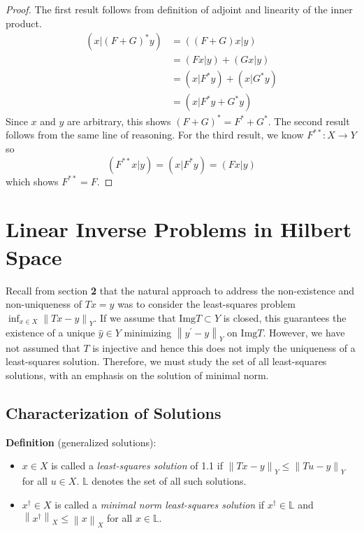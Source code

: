 \documentclass[12pt]{article}
\newcommand*{\norm}[1]{\left\lVert#1\right\rVert}
\newcommand{\Img}{\mathrm{Img}}
\begin{document}
\begin{proof} 
The first result follows from definition of adjoint and linearity of the inner product. 
\begin{align*} 
(x|(F + G)^*y) &= ((F + G)x|y) \\
                       &= (Fx|y) + (Gx|y) \\
                       &= (x|F^*y) + (x|G^*y) \\
                       &= (x|F^*y + G^*y)
\end{align*} 
Since $x$ and $y$ are arbitrary, this shows $(F + G)^* = F^* + G^*$. The second result follows from the 
same line of reasoning. For the third result, we know $F^{**}: X \to Y$ so 
\begin{equation*} 
(F^{**}x|y) = (x|F^*y) = (Fx|y)
\end{equation*} 
which shows $F^{**} = F$.
\end{proof} 




\section{Linear Inverse Problems in Hilbert Space}

 Recall from section \textbf{2} that the natural approach to address the non-existence and non-uniqueness of $Tx = y$ was to consider the least-squares problem $\inf_{x \in X} \norm{Tx - y}_Y$. If we assume that $\Img T \subset Y$ is closed, this guarantees the existence of a unique $\hat{y} \in Y$ minimizing $\norm{y^\prime - y}_Y$ on $\Img T$. However, we have not assumed that $T$ is injective and hence this does not imply the uniqueness of a least-squares solution. Therefore, we must study the set of all least-squares solutions, with an emphasis on the solution of minimal norm. 

\subsection{Characterization of Solutions}

 \textbf{Definition} (generalized solutions): 
 \begin{itemize}
 \item $x \in X$ is called a \textit{least-squares solution} of 1.1 if $\norm{Tx - y}_Y \leq \norm{Tu - y}_Y$ for all $u \in X$. $\mathbb{L}$ denotes the set of all such solutions. 
 \item $x^\dagger \in X$ is called a \textit{minimal norm least-squares solution} if $x^\dagger \in \mathbb{L}$ and $\norm{x^\dagger}_X \leq \norm{x}_X$ for all $x \in \mathbb{L}$. 
 \end{itemize} 
 
\end{document}
